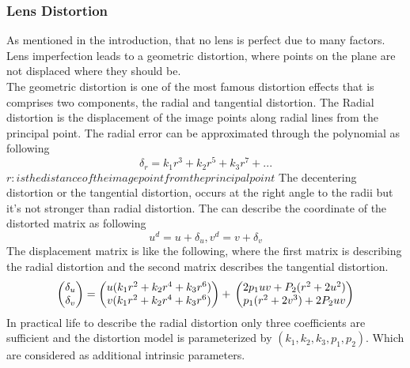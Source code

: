 \documentclass[journal,final,a4paper,twoside]{PS}
\begin{document}
\subsubsection{Lens Distortion}
As mentioned in the introduction, that no lens is perfect due to many factors. Lens imperfection leads to a geometric distortion, where points on the plane are not displaced where they should be.
\\
The geometric distortion is one of the most famous distortion effects that is comprises two components, the radial and tangential distortion. The Radial distortion is the displacement of the image points along radial lines from the principal point. The radial error can be approximated through the polynomial as following 
\begin{equation}
\delta_r=k_1r^3+k_2r^5+k_3r^7+...
\end{equation}
$r:is the distance of the image point from the principal point$
The decentering distortion or the tangential distortion, occurs at the right angle to the radii but it's not stronger than radial distortion.
The can describe the coordinate of the distorted matrix as following 
\begin{equation}
u^d = u+\delta_u,v^d=v+\delta_v
\end{equation}
The displacement matrix is like the following, where the first matrix is describing the radial distortion and the second matrix describes the tangential distortion\cite{Corke}.
\begin{equation}
\begin{pmatrix}
\delta_u\\
\delta_v\\
\end{pmatrix}=\begin{pmatrix}
u(k_1r^2+k_2r^4+k_3r^6)\\
v(k_1r^2+k_2r^4+k_3r^6)\\
\end{pmatrix}+\\
\begin{pmatrix}
2p_1uv+P_2(r^2+2u^2)\\
p_1(r^2+2v^3)+2P_2uv
\end{pmatrix}
\end{equation}
In practical life to describe the radial distortion only three coefficients are sufficient and the distortion model is parameterized by $(k_1,k_2,k_3,p_1,p_2)$. Which are considered as additional intrinsic parameters.
\end{document}
